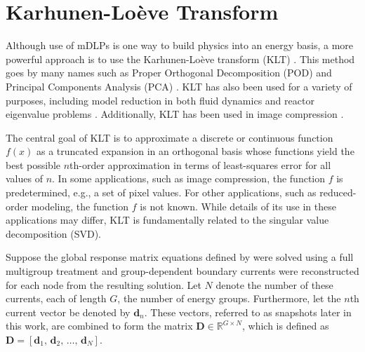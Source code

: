 
\chapter{Karhunen-Lo\`{e}ve Transform} %

\label{Chapter3} 


Although use of mDLPs is one way to build physics into an energy basis, a more 
powerful approach is to use the Karhunen-Lo\`{e}ve transform (KLT)
\citep{Dony2001}.  This method goes by many names such as Proper 
Orthogonal Decomposition (POD) \citep{Buchan2013} and Principal Components 
Analysis (PCA) \citep{Dony2001}.  KLT has also been used for a variety of 
purposes, including model reduction in both fluid dynamics 
\citep{Sirovich1987} and reactor eigenvalue problems \citep{Buchan2013}.  
Additionally, KLT has been used in image compression \citep{Dony2001}.

The central goal of KLT is to approximate a discrete or continuous function 
$f(x)$ as a truncated expansion in an orthogonal basis whose functions yield the 
best possible $n$th-order approximation in terms of least-squares error for all 
values of $n$.  In some applications, such as image compression, the function 
$f$ is predetermined, e.g., a set of pixel values. For other applications, such 
as reduced-order modeling, the function $f$ is not known.  While details of its 
use in these applications may differ, KLT is fundamentally related to the 
singular value decomposition (SVD).

Suppose the global response matrix equations defined by  were 
solved using a full multigroup treatment and group-dependent boundary currents 
were reconstructed for each node from the resulting solution. Let $N$ denote the 
number of these currents, each of length $G$, the number of energy groups.  
Furthermore, let the $n$th current vector be denoted by $\mathbf{d}_n$.  These 
vectors, referred to as snapshots later in this work, are combined to form the 
matrix $\mathbf{D} \in \mathbb{R}^{G\times N}$, which is defined as $\mathbf{D} 
= [\mathbf{d}_1,\, \mathbf{d}_2,\, \ldots, \, \mathbf{d}_N]$. 

